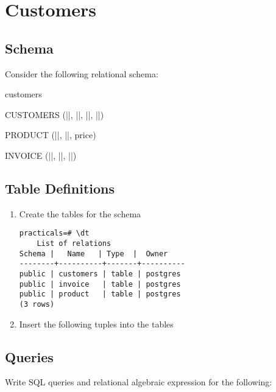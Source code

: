 \section{Customers}

\subsection{Schema}

Consider the following relational schema:

\begin{sqlSchema}{customers}

    CUSTOMERS (||, ||, ||, ||)

    PRODUCT (||, ||, price)

    INVOICE (||, ||, ||)

\end{sqlSchema}

\subsection{Table Definitions}

\begin{enumerate}[label=\alph*)]
    \item Create the tables for the schema


          \begin{lstlisting}[style=output]
practicals=# \dt
    List of relations
Schema |   Name   | Type  |  Owner
--------+----------+-------+----------
public | customers | table | postgres
public | invoice   | table | postgres
public | product   | table | postgres
(3 rows)
          \end{lstlisting}

    \item Insert the following tuples into the tables


\end{enumerate}

\subsection{Queries}

Write SQL queries and relational algebraic expression for the following:

